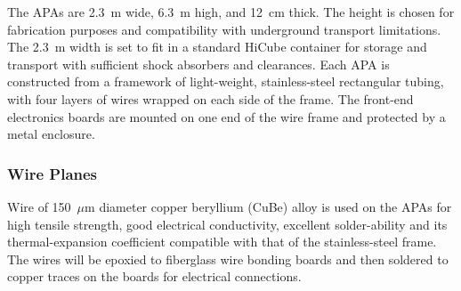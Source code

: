 The APAs are 2.3~m wide, 6.3~m high, and 12~cm thick. The height is
chosen for fabrication purposes and compatibility with underground
transport limitations. The 2.3~m width is set to fit in a standard
HiCube container for storage and transport with sufficient shock
absorbers and clearances.  Each APA is constructed from a framework of
light-weight, stainless-steel rectangular tubing, with four layers of
wires wrapped on each side of the frame. The front-end electronics
boards are mounted on one end of the wire frame and protected by a
metal enclosure.


\subsubsection{Wire Planes}
\label{subsec:fd-ref-wireplanes}

Wire of 150~$\mu$m diameter copper beryllium (CuBe) alloy is used on the
APAs for high tensile strength, good electrical conductivity,
excellent solder-ability and its thermal-expansion coefficient
compatible with that of the stainless-steel frame.  The wires will be
epoxied to fiberglass wire bonding boards and then soldered to copper
traces on the boards for electrical connections.

